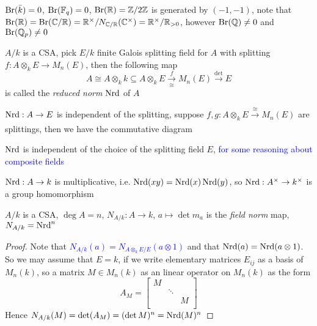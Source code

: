 \documentclass[a4paper,10pt]{article}
\begin{document}
$\operatorname{Br}(\bar k)=0$, $\operatorname{Br}(\mathbb F_q)=0$, $\operatorname{Br}(\mathbb R)=\mathbb Z/2\mathbb Z$ is generated by $(-1,-1)$, note that $\operatorname{Br}(\mathbb R)=\operatorname{Br}(\mathbb C/\mathbb R)=\mathbb R^\times/N_{\mathbb C/\mathbb R}(\mathbb C^\times)=\mathbb R^\times/\mathbb R_{>0}$, however $\operatorname{Br}(\mathbb Q)\neq 0$ and $\operatorname{Br}(\mathbb Q_p)\neq 0$

\begin{definition}
$A/k$ is a CSA, pick $E/k$ finite Galois splitting field for $A$ with splitting $f:A\otimes_kE\to M_n(E)$, then the following map
\[
A\cong A\otimes_kk\subseteq A\otimes_kE\xrightarrow[\cong]{f}M_n(E)\xrightarrow[]{\det}E
\]
is called the \textit{reduced norm} $\operatorname{Nrd}$ of $A$
\end{definition}

\begin{remark}
$\operatorname{Nrd}:A\to E$ is independent of the splitting, suppose $f,g:A\otimes_kE\xrightarrow[]{\cong}M_n(E)$ are splittings, then we have the commutative diagram
\begin{center}
\end{center}
$\operatorname{Nrd}$ is independent of the choice of the splitting field $E$, \textcolor{blue}{for some reasoning about composite fields}
\end{remark}

\begin{remark}
$\operatorname{Nrd}:A\to k$ is multiplicative, i.e. $\operatorname{Nrd}(xy)=\operatorname{Nrd}(x)\operatorname{Nrd}(y)$, so $\operatorname{Nrd}:A^\times\to k^\times$ is a group homomorphism
\end{remark}

\begin{proposition}
$A/k$ is a CSA, $\deg A=n$, $N_{A/k}:A\to k$, $a\mapsto\det m_a$ is the \textit{field norm} map, $N_{A/k}=\operatorname{Nrd}^n$
\end{proposition}

\begin{proof}
Note that \textcolor{blue}{$N_{A/k}(a)=N_{A\otimes_kE/E}(a\otimes1)$} and that $\operatorname{Nrd}(a)=\operatorname{Nrd}(a\otimes1)$. So we may assume that $E=k$, if we write elementary matrices $E_{ij}$ as a basis of $M_n(k)$, so a matrix $M\in M_n(k)$ as an linear operator on $M_n(k)$ as the form
\[
A_M=\begin{bmatrix}
M&&\\
&\ddots&\\
&&M\\
\end{bmatrix}
\]
Hence $N_{A/k}(M)=\det(A_M)=(\det M)^n=\operatorname{Nrd}(M)^n$
\end{proof}
\end{document}
